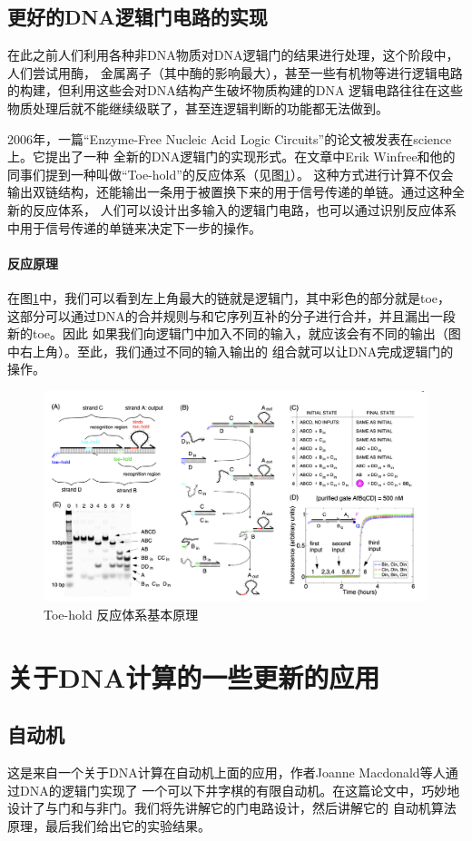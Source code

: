 \documentclass[a4paper,twoside]{article}
\begin{document}
\subsection{更好的DNA逻辑门电路的实现}
在此之前人们利用各种非DNA物质对DNA逻辑门的结果进行处理，这个阶段中，人们尝试用酶，
金属离子（其中酶的影响最大），甚至一些有机物等进行逻辑电路的构建，但利用这些会对DNA结构产生破坏物质构建的DNA
逻辑电路往往在这些物质处理后就不能继续级联了，甚至连逻辑判断的功能都无法做到。

2006年，一篇“Enzyme-Free Nucleic Acid Logic Circuits”\cite{ref3}的论文被发表在science上。它提出了一种
全新的DNA逻辑门的实现形式。在文章中Erik Winfree和他的同事们提到一种叫做“Toe-hold”的反应体系（见图\ref{toe-hold-concept}）。
这种方式进行计算不仅会输出双链结构，还能输出一条用于被置换下来的用于信号传递的单链。通过这种全新的反应体系，
人们可以设计出多输入的逻辑门电路，也可以通过识别反应体系中用于信号传递的单链来决定下一步的操作。

\paragraph{反应原理}
在图\ref{toe-hold-concept}中，我们可以看到左上角最大的链就是逻辑门，其中彩色的部分就是toe，
这部分可以通过DNA的合并规则与和它序列互补的分子进行合并，并且漏出一段新的toe。因此
如果我们向逻辑门中加入不同的输入，就应该会有不同的输出（图中右上角）。至此，我们通过不同的输入输出的
组合就可以让DNA完成逻辑门的操作。
\begin{figure}
	\centering
	\includegraphics[width=0.9\linewidth]{images/toe-hold-concept.png}
	\caption{Toe-hold 反应体系基本原理}
	\label{toe-hold-concept}
\end{figure}
\pagebreak
\section{关于DNA计算的一些更新的应用}
\subsection{自动机}
这是来自一个关于DNA计算在自动机上面的应用\cite{ref4}，作者Joanne Macdonald等人通过DNA的逻辑门实现了
一个可以下井字棋的有限自动机。在这篇论文中，巧妙地设计了与门和与非门。我们将先讲解它的门电路设计，然后讲解它的
自动机算法原理，最后我们给出它的实验结果。
\end{document}
